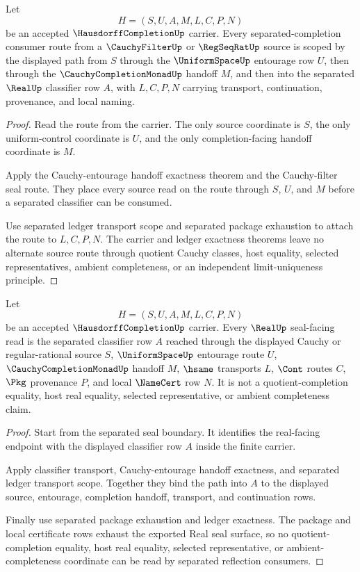 \begin{theorem}
\label{thm:hausdorffcompletion-cauchy-source-route-scope}
Let
$$
H=(S,U,A,M,L,C,P,N)
$$
be an accepted $\HausdorffCompletionUp$ carrier. Every separated-completion consumer route from a $\CauchyFilterUp$ or $\RegSeqRatUp$ source is scoped by the displayed path from $S$ through the $\UniformSpaceUp$ entourage row $U$, then through the $\CauchyCompletionMonadUp$ handoff $M$, and then into the separated $\RealUp$ classifier row $A$, with $L,C,P,N$ carrying transport, continuation, provenance, and local naming.
\end{theorem}
\begin{proof}
Read the route from the carrier. The only source coordinate is $S$, the only uniform-control coordinate is $U$, and the only completion-facing handoff coordinate is $M$.

Apply the Cauchy-entourage handoff exactness theorem and the Cauchy-filter seal route. They place every source read on the route through $S$, $U$, and $M$ before a separated classifier can be consumed.

Use separated ledger transport scope and separated package exhaustion to attach the route to $L,C,P,N$. The carrier and ledger exactness theorems leave no alternate source route through quotient Cauchy classes, host equality, selected representatives, ambient completeness, or an independent limit-uniqueness principle.
\end{proof}

\begin{theorem}
\label{thm:hausdorffcompletion-real-seal-nonquotient-boundary}
Let
$$
H=(S,U,A,M,L,C,P,N)
$$
be an accepted $\HausdorffCompletionUp$ carrier. Every $\RealUp$ seal-facing read is the separated classifier row $A$ reached through the displayed Cauchy or regular-rational source $S$, $\UniformSpaceUp$ entourage route $U$, $\CauchyCompletionMonadUp$ handoff $M$, $\hsame$ transports $L$, $\Cont$ routes $C$, $\Pkg$ provenance $P$, and local $\NameCert$ row $N$. It is not a quotient-completion equality, host real equality, selected representative, or ambient completeness claim.
\end{theorem}
\begin{proof}
Start from the separated seal boundary. It identifies the real-facing endpoint with the displayed classifier row $A$ inside the finite carrier.

Apply classifier transport, Cauchy-entourage handoff exactness, and separated ledger transport scope. Together they bind the path into $A$ to the displayed source, entourage, completion handoff, transport, and continuation rows.

Finally use separated package exhaustion and ledger exactness. The package and local certificate rows exhaust the exported Real seal surface, so no quotient-completion equality, host real equality, selected representative, or ambient-completeness coordinate can be read by separated reflection consumers.
\end{proof}

